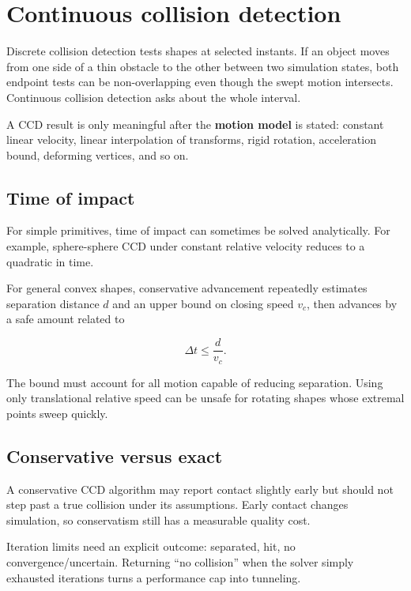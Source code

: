 \hypertarget{appendix-66956ed6c753}{}\label{referencestart:appendix-66956ed6c753}
\section{Continuous collision detection}\label{appendix-66956ed6c753-continuous-collision-detection}

Discrete collision detection tests shapes at selected instants. If an object moves from one side of a thin obstacle to the other between two simulation states, both endpoint tests can be non-overlapping even though the swept motion intersects. Continuous collision detection asks about the whole interval.

A CCD result is only meaningful after the \textbf{motion model} is stated: constant linear velocity, linear interpolation of transforms, rigid rotation, acceleration bound, deforming vertices, and so on.

\subsection{Time of impact}\label{appendix-66956ed6c753-time-of-impact}

For simple primitives, time of impact can sometimes be solved analytically. For example, sphere-sphere CCD under constant relative velocity reduces to a quadratic in time.

For general convex shapes, conservative advancement repeatedly estimates separation distance \(d\) and an upper bound on closing speed \(v_c\), then advances by a safe amount related to

\[
\Delta t\le \frac{d}{v_c}.
\]

The bound must account for all motion capable of reducing separation. Using only translational relative speed can be unsafe for rotating shapes whose extremal points sweep quickly.

\subsection{Conservative versus exact}\label{appendix-66956ed6c753-conservative-versus-exact}

A conservative CCD algorithm may report contact slightly early but should not step past a true collision under its assumptions. Early contact changes simulation, so conservatism still has a measurable quality cost.

Iteration limits need an explicit outcome: separated, hit, no convergence/uncertain. Returning ``no collision'' when the solver simply exhausted iterations turns a performance cap into tunneling.

